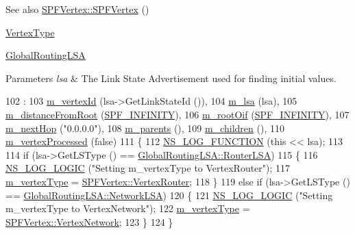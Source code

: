 \begin{DoxySeeAlso}{See also}
\hyperlink{classns3_1_1SPFVertex_af9b97ef620c4e53fa8632efb4d7d6b69}{S\+P\+F\+Vertex\+::\+S\+P\+F\+Vertex} () 

\hyperlink{classns3_1_1SPFVertex_a20f8a4cfc99a1b7ecd10a23151b93afd}{Vertex\+Type} 

\hyperlink{classns3_1_1GlobalRoutingLSA}{Global\+Routing\+L\+SA} 
\end{DoxySeeAlso}

\begin{DoxyParams}{Parameters}
{\em lsa} & The Link State Advertisement used for finding initial values. \\
\hline
\end{DoxyParams}

\begin{DoxyCode}
102                                            : 
103   \hyperlink{classns3_1_1SPFVertex_adb37c35d8a95e05cc72bb9f8821dc3d3}{m\_vertexId} (lsa->GetLinkStateId ()),
104   \hyperlink{classns3_1_1SPFVertex_a5f64e98f7b9df501b92b454c471ea861}{m\_lsa} (lsa),
105   \hyperlink{classns3_1_1SPFVertex_ab4e836176a21fc534eec7ca0b382caa6}{m\_distanceFromRoot} (\hyperlink{namespacens3_a769ef05d7ddcbbcb31343fa01a4d270b}{SPF\_INFINITY}), 
106   \hyperlink{classns3_1_1SPFVertex_aa6261717badceedb17b565549a86f14d}{m\_rootOif} (\hyperlink{namespacens3_a769ef05d7ddcbbcb31343fa01a4d270b}{SPF\_INFINITY}),
107   \hyperlink{classns3_1_1SPFVertex_a1012ff41d6143a2d4fb467b5bf2fbfab}{m\_nextHop} (\textcolor{stringliteral}{"0.0.0.0"}),
108   \hyperlink{classns3_1_1SPFVertex_af644854d7d83ccd2200a657dceaea0f8}{m\_parents} (),
109   \hyperlink{classns3_1_1SPFVertex_af075e299721e613e5514392c3b3122c4}{m\_children} (),
110   \hyperlink{classns3_1_1SPFVertex_ac629016bfe46ad93090d6ae92782769d}{m\_vertexProcessed} (\textcolor{keyword}{false})
111 \{
112   \hyperlink{log-macros-disabled_8h_a90b90d5bad1f39cb1b64923ea94c0761}{NS\_LOG\_FUNCTION} (\textcolor{keyword}{this} << lsa);
113 
114   \textcolor{keywordflow}{if} (lsa->GetLSType () == \hyperlink{classns3_1_1GlobalRoutingLSA_a34eb53a1ed37c877923b74d671224fdeada9e6185a392b3bb450846f5282e415d}{GlobalRoutingLSA::RouterLSA}) 
115     \{
116       \hyperlink{group__logging_ga88acd260151caf2db9c0fc84997f45ce}{NS\_LOG\_LOGIC} (\textcolor{stringliteral}{"Setting m\_vertexType to VertexRouter"});
117       \hyperlink{classns3_1_1SPFVertex_af2b0b127b4e6830d836a85506943e9fb}{m\_vertexType} = \hyperlink{classns3_1_1SPFVertex_a20f8a4cfc99a1b7ecd10a23151b93afda340822983a2833fff14de88ea20a3f31}{SPFVertex::VertexRouter};
118     \}
119   \textcolor{keywordflow}{else} \textcolor{keywordflow}{if} (lsa->GetLSType () == \hyperlink{classns3_1_1GlobalRoutingLSA_a34eb53a1ed37c877923b74d671224fdeab37398976cdc8ddd08e1428a4700b5b4}{GlobalRoutingLSA::NetworkLSA}) 
120     \{ 
121       \hyperlink{group__logging_ga88acd260151caf2db9c0fc84997f45ce}{NS\_LOG\_LOGIC} (\textcolor{stringliteral}{"Setting m\_vertexType to VertexNetwork"});
122       \hyperlink{classns3_1_1SPFVertex_af2b0b127b4e6830d836a85506943e9fb}{m\_vertexType} = \hyperlink{classns3_1_1SPFVertex_a20f8a4cfc99a1b7ecd10a23151b93afda00415acb788d8d95bee545fe2046c2a8}{SPFVertex::VertexNetwork};
123     \}
124 \}
\end{DoxyCode}


